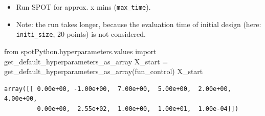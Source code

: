 \documentclass[
  letterpaper,
  DIV=11,
  numbers=noendperiod]{scrreprt}
\newenvironment{Shaded}{\begin{snugshade}}{\end{snugshade}}
\newcommand{\ImportTok}[1]{\textcolor[rgb]{0.00,0.46,0.62}{#1}}
\newcommand{\NormalTok}[1]{\textcolor[rgb]{0.00,0.23,0.31}{#1}}
\newcommand{\OperatorTok}[1]{\textcolor[rgb]{0.37,0.37,0.37}{#1}}
\providecommand{\tightlist}{%
  \setlength{\itemsep}{0pt}\setlength{\parskip}{0pt}}\usepackage{longtable,booktabs,array}
\begin{document}
\begin{itemize}
\tightlist
\item
  Run SPOT for approx. x mins (\texttt{max\_time}).
\item
  Note: the run takes longer, because the evaluation time of initial
  design (here: \texttt{initi\_size}, 20 points) is not considered.
\end{itemize}

\begin{Shaded}
\begin{Highlighting}[]
\ImportTok{from}\NormalTok{ spotPython.hyperparameters.values }\ImportTok{import}\NormalTok{ get\_default\_hyperparameters\_as\_array}
\NormalTok{X\_start }\OperatorTok{=}\NormalTok{ get\_default\_hyperparameters\_as\_array(fun\_control)}
\NormalTok{X\_start}
\end{Highlighting}
\end{Shaded}

\begin{verbatim}
array([[ 0.00e+00, -1.00e+00,  7.00e+00,  5.00e+00,  2.00e+00,  4.00e+00,
         0.00e+00,  2.55e+02,  1.00e+00,  1.00e+01,  1.00e-04]])
\end{verbatim}
\end{document}
